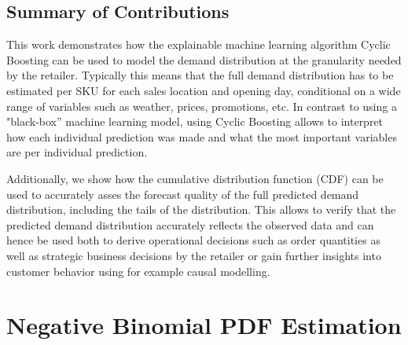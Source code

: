 \documentclass[BCOR=1mm, DIV=calc,10pt,
twoside=true,
twocolumn,
headings=normal]{scrartcl}
\begin{document}
\subsection*{Summary of Contributions}

This work demonstrates how the explainable machine learning algorithm Cyclic Boosting \cite{Wick2019} can be used to model the demand distribution at the granularity needed by the retailer. Typically this means that the full demand distribution has to be estimated per SKU for each sales location and opening day, conditional on a wide range of variables such as weather, prices, promotions, etc. In contrast to using a "black-box'' machine learning model, using Cyclic Boosting allows to interpret how each individual prediction was made and what the most important variables are per individual prediction.

Additionally, we show how the cumulative distribution function (CDF) can be used to accurately asses the forecast quality of the full predicted demand distribution, including the tails of the distribution. This allows to verify that the predicted demand distribution accurately reflects the observed data and can hence be used both to derive operational decisions such as  order quantities as well as strategic business decisions by the retailer or gain further insights into customer behavior using for example causal modelling.


\section{Negative Binomial PDF Estimation}
\label{sec:pdfEstimation}
\end{document}
